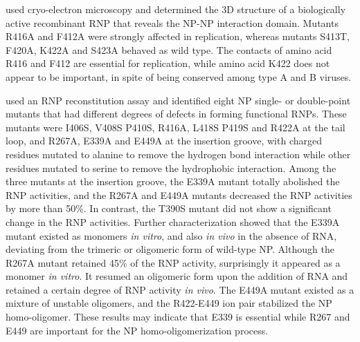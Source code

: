 
\citep{1447} used cryo-electron microscopy and determined the 3D structure of a biologically active recombinant RNP that reveals the NP-NP interaction domain. Mutants R416A and F412A were strongly affected in replication, whereas mutants S413T, F420A, K422A and S423A behaved as wild type. The contacts of amino acid R416 and F412 are essential for replication, while amino acid K422 does not appear to be important, in spite of being conserved among type A and B viruses.

\citep{1232} used an RNP reconstitution assay and identified eight NP single- or double-point mutants that had different degrees of defects in forming functional RNPs. These mutants were I406S, V408S P410S, R416A, L418S P419S and R422A at the tail loop, and R267A, E339A and E449A at the insertion groove, with charged residues mutated to alanine to remove the hydrogen bond interaction while other residues mutated to serine to remove the hydrophobic interaction. Among the three mutants at the insertion groove, the E339A mutant totally abolished the RNP activities, and the R267A and E449A mutants decreased the RNP activities by more than 50\%. In contrast, the T390S mutant did not show a significant change in the RNP activities. Further characterization showed that the E339A mutant existed as monomers \textit{in vitro}, and also \textit{in vivo} in the absence of RNA, deviating from the trimeric or oligomeric form of wild-type NP. Although the R267A mutant retained 45\% of the RNP activity, surprisingly it appeared as a monomer \textit{in vitro}. It resumed an oligomeric form upon the addition of RNA and retained a certain degree of RNP activity \textit{in vivo}. The E449A mutant existed as a mixture of unstable oligomers, and the R422-E449 ion pair stabilized the NP homo-oligomer. These results may indicate that E339 is essential while R267 and E449 are important for the NP homo-oligomerization process.

